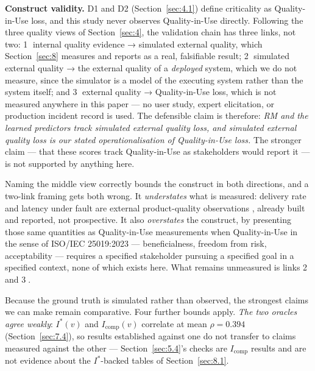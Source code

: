 \textbf{Construct validity.} D1 and D2 (Section~\ref{sec:4.1}) define criticality as Quality-in-Use
loss, and this study never observes Quality-in-Use directly. Following the three quality views of
Section~\ref{sec:4}, the validation chain has three links, not two: \textcircled{\scriptsize 1}
internal quality evidence → simulated external quality, which Section~\ref{sec:8} measures and
reports as a real, falsifiable result; \textcircled{\scriptsize 2} simulated external quality → the
external quality of a \emph{deployed} system, which we do not measure, since the simulator is a model
of the executing system rather than the system itself; and \textcircled{\scriptsize 3} external
quality → Quality-in-Use loss, which is not measured anywhere in this paper --- no user study, expert
elicitation, or production incident record is used. The defensible claim is therefore: \emph{RM and
the learned predictors track simulated external quality loss, and simulated external quality loss is
our stated operationalisation of Quality-in-Use loss.} The stronger claim --- that these scores track
Quality-in-Use as stakeholders would report it --- is not supported by anything here.

Naming the middle view correctly bounds the construct in both directions, and a two-link framing gets
both wrong. It \emph{understates} what is measured: delivery rate and latency under fault are
external product-quality observations \cite{iso25023_2016}, already built and reported, not
prospective. It also \emph{overstates} the construct, by presenting those same quantities as
Quality-in-Use measurements when Quality-in-Use in the sense of ISO/IEC 25019:2023
\cite{iso25019_2023} --- beneficialness, freedom from risk, acceptability \cite{iso25022_2016} ---
requires a specified stakeholder pursuing a specified goal in a specified context, none of which
exists here. What remains unmeasured is links \textcircled{\scriptsize 2} and
\textcircled{\scriptsize 3}.

Because the ground truth is simulated rather than observed, the strongest claims we can make remain
comparative. Four further bounds apply. \emph{The two oracles agree weakly}: \(I^*(v)\) and
\(I_{\text{comp}}(v)\) correlate at mean \(\rho=0.394\) (Section~\ref{sec:7.4}), so results
established against one do not transfer to claims measured against the other ---
Section~\ref{sec:5.4}'s checks are \(I_{\text{comp}}\) results and are not evidence about the
\(I^*\)-backed tables of Section~\ref{sec:8.1}.

